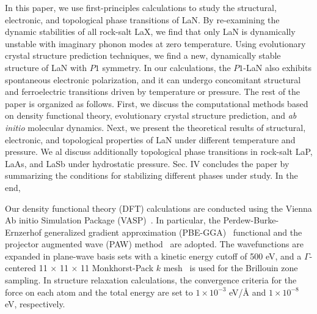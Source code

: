 	In this paper, we use first-principles calculations to study the structural, electronic, and topological phase transitions of LaN. By re-examining the dynamic stabilities of all rock-salt LaX, we find that only LaN is dynamically unstable with imaginary phonon modes at zero temperature. Using evolutionary crystal structure prediction techniques, we find a new, dynamically stable structure of LaN with $P1$ symmetry. In our calculations, the $P1$-LaN also exhibits spontaneous electronic polarization, and it can undergo concomitant structural and ferroelectric transitions driven by temperature or pressure. 	The rest of the paper is organized as follows. First, we discuss the computational methods based on density functional theory, evolutionary crystal structure prediction, and {\it ab initio} molecular dynamics. Next, we present the theoretical results of structural, electronic, and topological properties of LaN under different temperature and pressure. We al discuss additionally topological phase transitions in rock-salt LaP, LaAs, and LaSb under hydrostatic pressure.
	Sec. IV concludes the paper by summarizing the conditions for stabilizing different phases under study. In the end,
	
	
	Our density functional theory (DFT) calculations are conducted using the Vienna Ab initio Simulation Package (VASP)~\cite{kresse1996efficiency,kresse1996efficient, VASP_GPU_1, VASP_GPU_2}. In particular, the Perdew-Burke-Ernzerhof generalized gradient approximation (PBE-GGA)~\cite{PBE} functional and the projector augmented wave (PAW) method~\cite{PAW_1, PAW_2} are adopted. The wavefunctions are expanded in plane-wave basis sets with a kinetic energy cutoff of 500 eV, and a $\Gamma$-centered 11 $\times$ 11 $\times$ 11  Monkhorst-Pack $k$ mesh~\cite{MP} is used for the Brillouin zone sampling. In structure relaxation calculations, the convergence criteria for the force on each atom and the total energy are set to $1\times 10^{-3}$ eV/\r{A} and $1 \times 10^{-8}$ eV, respectively.
	
		
